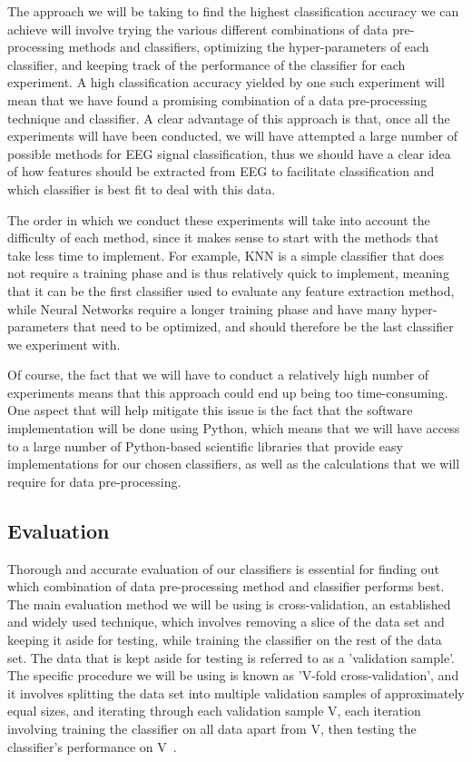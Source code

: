 \documentclass{mprop}
\begin{document}
The approach we will be taking to find the highest classification accuracy we can achieve will involve trying the various different combinations of data pre-processing methods and classifiers, optimizing the hyper-parameters of each classifier, and keeping track of the performance of the classifier for each experiment. A high classification accuracy yielded by one such experiment will mean that we have found a promising combination of a data pre-processing technique and classifier. A clear advantage of this approach is that, once all the experiments will have been conducted, we will have attempted a large number of possible methods for EEG signal classification, thus we should have a clear idea of how features should be extracted from EEG to facilitate classification and which classifier is best fit to deal with this data.

The order in which we conduct these experiments will take into account the difficulty of each method, since it makes sense to start with the methods that take less time to implement. For example, KNN is a simple classifier that does not require a training phase and is thus relatively quick to implement, meaning that it can be the first classifier used to evaluate any feature extraction method, while Neural Networks require a longer training phase and have many hyper-parameters that need to be optimized, and should therefore be the last classifier we experiment with.

Of course, the fact that we will have to conduct a relatively high number of experiments means that this approach could end up being too time-consuming. One aspect that will help mitigate this issue is the fact that the software implementation will be done using Python, which means that we will have access to a large number of Python-based scientific libraries that provide easy implementations for our chosen classifiers, as well as the calculations that we will require for data pre-processing.

\subsection{Evaluation}

Thorough and accurate evaluation of our classifiers is essential for finding out which combination of data pre-processing method and classifier performs best. The main evaluation method we will be using is cross-validation, an established and widely used technique, which involves removing a slice of the data set and keeping it aside for testing, while training the classifier on the rest of the data set. The data that is kept aside for testing is referred to as a 'validation sample'. The specific procedure we will be using is known as 'V-fold cross-validation', and it involves splitting the data set into multiple validation samples of approximately equal sizes, and iterating through each validation sample V, each iteration involving training the classifier on all data apart from V, then testing the classifier's performance on V~\cite{arlot_survey_2010}.
\end{document}
